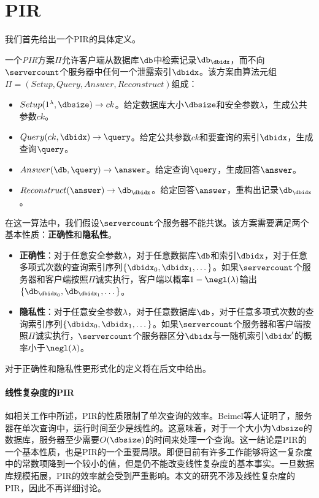 \section{PIR}


我们首先给出一个PIR的具体定义。

\begin{definition}[PIR]
    一个\textit{PIR}方案$\Pi$允许客户端从数据库$\db$中检索记录$\db_\dbidx$，而不向$\servercount$个服务器中任何一个泄露索引$\dbidx$。该方案由算法元组$\Pi = (Setup, Query, Answer, Reconstruct)$组成：
    \begin{itemize}[leftmargin=*]
        \item $Setup(1^\lambda,\dbsize) \rightarrow ck$。给定数据库大小$\dbsize$和安全参数$\lambda$，生成公共参数$ck$。
        \item $Query(ck, \dbidx) \rightarrow \query$。给定公共参数$ck$和要查询的索引$\dbidx$，生成查询$\query$。
        \item $Answer(\db, \query) \rightarrow \answer$。给定查询$\query$，生成回答$\answer$。
        \item $Reconstruct(\answer) \rightarrow \db_\dbidx$。给定回答$\answer$，重构出记录$\db_\dbidx$。
    \end{itemize}
    在这一算法中，我们假设$\servercount$个服务器不能共谋。该方案需要满足两个基本性质：\textbf{正确性}和\textbf{隐私性}。
    \begin{itemize}[leftmargin=*]
        \item \textbf{正确性}：对于任意安全参数$\lambda$，对于任意数据库$\db$和索引$\dbidx$，对于任意多项式次数的查询索引序列$\{\dbidx_0,\dbidx_1, \dots\}$。如果$\servercount$个服务器和客户端按照$\Pi$诚实执行，客户端以概率$1-\negl(\lambda)$输出$\{\db_{\dbidx_0},\db_{\dbidx_1}, \dots\}$。
        \item \textbf{隐私性}：对于任意安全参数$\lambda$，对于任意数据库$\db$，对于任意多项式次数的查询索引序列$\{\dbidx_0,\dbidx_1, \dots\}$。如果$\servercount$个服务器和客户端按照$\Pi$诚实执行，$\servercount$个服务器区分$\dbidx$与一随机索引$\dbidx'$的概率小于$\negl(\lambda)$。
    \end{itemize}
    对于正确性和隐私性更形式化的定义将在后文中给出。
\end{definition}

\paragraph{线性复杂度的PIR}
如相关工作中所述，PIR的性质限制了单次查询的效率。Beimel\cite{C:BeiIshMal00}等人证明了，服务器在单次查询中，运行时间至少是线性的。这意味着，对于一个大小为$\dbsize$的数据库，服务器至少需要$O(\dbsize)$的时间来处理一个查询。这一结论是PIR的一个基本性质，也是PIR的一个重要局限。即便目前有许多工作能够将这一复杂度中的常数项降到一个较小的值，但是仍不能改变线性复杂度的基本事实。一旦数据库规模拓展，PIR的效率就会受到严重影响。本文的研究不涉及线性复杂度的PIR，因此不再详细讨论。

